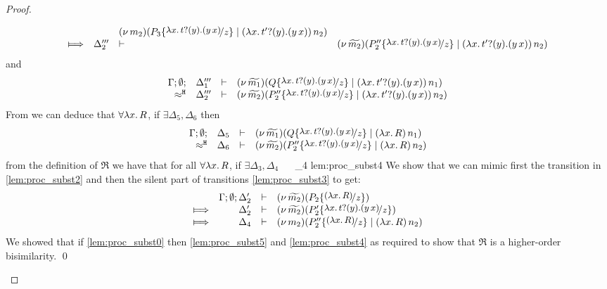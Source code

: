 \begin{proof}
\begin{enumerate}
\begin{itemize}
\begin{eqnarray}
\begin{array}{crll}
												&&	\newsp{m_2}{P_3 \subst{\trvalx{t}}{z} \Par \appl{(\trvalx{t'})}{n_2}}
									\\
									\Hby{}	& \Delta_2''' & \proves & \newsp{\widetilde{m_2}}{P_2'' \subst{\trvalx{t}}{z} \Par \appl{(\trvalx{t'})}{n_2}}
								\end{array}
								\label{lem:proc_subst3}
							\end{eqnarray}
							and
							\begin{eqnarray*}
								\mhorel{\Gamma}{\Delta_1'''}{\newsp{\widetilde{m_1}}{Q \subst{\trvalx{t}}{z} \Par \appl{(\trvalx{t'})}{n_1}}}
								{\hwb}
								{\Delta_2'''}{}{\newsp{\widetilde{m_2}}{P_2'' \subst{\trvalx{t}}{z} \Par \appl{(\trvalx{t'})}{n_2}}}
							\end{eqnarray*}
							From  we can deduce that $\forall \lambda x.\,R$, if $\exists \Delta_5, \Delta_6$ then
							\begin{eqnarray*}
								\mhorel{\Gamma}{\Delta_5}{\newsp{\widetilde{m_1}}{Q \subst{\trvalx{t}}{z} \Par \appl{(\abs{x}{R})}{n_1}}}
								{\hwb}
								{\Delta_6}{}{\newsp{\widetilde{m_2}}{P_2'' \subst{\trvalx{t}}{z} \Par \appl{(\abs{x}{R})}{n_2}}}
							\end{eqnarray*}
							from the definition of $\Re$ we have that for all $\forall \lambda x.\,R$, if $\exists \Delta_3, \Delta_4$
								{\ \Re\ }
								{\Delta_4}{}
								{lem:proc_subst4}
							We show that we can mimic first the
							transition in \eqref{lem:proc_subst2} and then the silent part of
							transitions \eqref{lem:proc_subst3} to get:
							\begin{eqnarray}
								\begin{array}{crll}
										& \Gamma; \es; \Delta_2' &\proves& \newsp{\widetilde{m_2}}{P_2 \subst{(\abs{x}{R})}{z}}
									\\
									\Hby{}	&	\Delta_2'			& \proves&	\newsp{\widetilde{m_2}}{P_2' \subst{\trvalx{t}}{z}}
									\\
									\Hby{} &	\Delta_4			& \proves&	\newsp{m_2}{P_2'' \subst{(\abs{x}{R})}{z} \Par \appl{(\abs{x}{R})}{n_2}}
								\end{array}
								\label{lem:proc_subst5}
							\end{eqnarray}
							We showed that if \eqref{lem:proc_subst0} then \eqref{lem:proc_subst5} and \eqref{lem:proc_subst4}
							as required to show that $\Re$ is a higher-order bisimilarity.
							\qed
				\end{itemize}
	\end{enumerate}
\end{proof}



